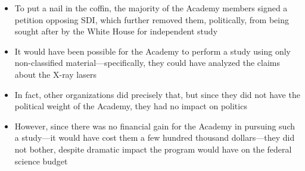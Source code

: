 \documentclass[12pt]{article}
\begin{document}
\begin{description}
\begin{description}
\begin{itemize}
          \item To put a nail in the coffin, the majority of the Academy
            members signed a petition opposing SDI, which further removed them,
            politically, from being sought after by the White House for
            independent study

          \item It would have been possible for the Academy to perform a study
            using only non-classified material---specifically, they could have
            analyzed the claims about the X-ray lasers

          \item In fact, other organizations did precisely that, but since they
            did not have the political weight of the Academy, they had no
            impact on politics

          \item However, since there was no financial gain for the Academy in
            pursuing such a study---it would have cost them a few hundred
            thousand dollars---they did not bother, despite dramatic impact the
            program would have on the federal science budget

        \end{itemize}
        

\end{description}
\end{description}
\end{document}

